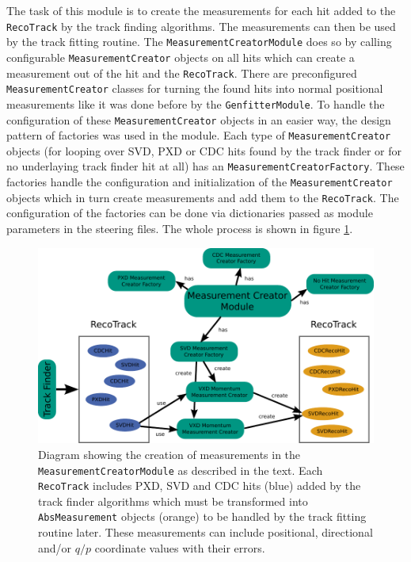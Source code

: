 The task of this module is to create the measurements for each hit added to the \texttt{RecoTrack} by the track finding algorithms. The measurements can then be used by the track fitting routine. The \texttt{MeasurementCreatorModule} does so by calling configurable \texttt{MeasurementCreator} objects on all hits which can create a measurement out of the hit and the \texttt{RecoTrack}. There are preconfigured \texttt{MeasurementCreator} classes for turning the found hits into normal positional measurements like it was done before by the \texttt{GenfitterModule}. To handle the configuration of these \texttt{MeasurementCreator} objects in an easier way, the design pattern of factories was used in the module. Each type of \texttt{MeasurementCreator} objects (for looping over SVD, PXD or CDC hits found by the track finder or for no underlaying track finder hit at all) has an \texttt{MeasurementCreatorFactory}. These factories handle the configuration and initialization of the \texttt{MeasurementCreator} objects which in turn create measurements and add them to the \texttt{RecoTrack}. The configuration of the factories can be done via dictionaries passed as module parameters in the steering files. The whole process is shown in figure \ref{fig-measurement-creator}.

\begin{figure}
  \centering
  \includegraphics[width=\linewidth]{figures/vxd/measurementCreator.pdf}
  \caption[Diagram showing the creation of measurements.]{Diagram showing the creation of measurements in the \texttt{MeasurementCreatorModule} as described in the text. Each \texttt{RecoTrack} includes PXD, SVD and CDC hits (blue) added by the track finder algorithms which must be transformed into \texttt{AbsMeasurement} objects (orange) to be handled by the track fitting routine later. These measurements can include positional, directional and/or $q/p$ coordinate values with their errors.}
  \label{fig-measurement-creator}
\end{figure}

